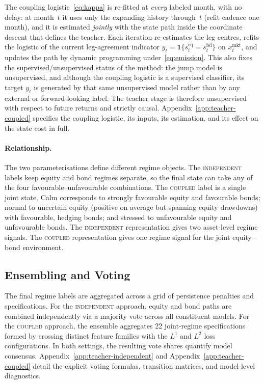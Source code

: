 \documentclass[10pt]{article}
\newcommand{\Acoup}{\textsc{coupled}}
\newcommand{\Bindep}{\textsc{independent}}
\begin{document}
The coupling logistic~\eqref{eq:kappa} is re-fitted at \emph{every} labeled month, with no
delay: at month~$t$ it uses only the expanding history through~$t$ (refit cadence one month),
and it is estimated \emph{jointly} with the state path inside the coordinate descent that
defines the teacher. Each iteration re-estimates the leg centres, refits the logistic of the
current leg-agreement indicator $y_t=\mathbf{1}\{s^{\mathrm{eq}}_t=s^{\mathrm{bd}}_t\}$ on
$x^{\mathrm{mkt}}_t$, and updates the path by dynamic programming under~\eqref{eq:emission}.
This also fixes the supervised/unsupervised status of the method: the jump model is
unsupervised, and although the coupling logistic is a supervised classifier, its target $y_t$
is generated by that same unsupervised model rather than by any external or forward-looking
label. The teacher stage is therefore unsupervised with respect to future returns and strictly
causal. Appendix~\ref{app:teacher-coupled} specifies the coupling logistic, its inputs, its
estimation, and its effect on the state cost in full.


\paragraph{Relationship.}
The two parameterisations define different regime objects. The \Bindep{} labels keep equity and bond regimes separate, so the final state can take any of the four favourable--unfavourable combinations. The \Acoup{} label is a single joint state. Calm corresponds to strongly favourable equity and favourable bonds; normal to uncertain equity (positive on average but spanning equity drawdowns) with favourable, hedging bonds; and stressed to unfavourable equity and unfavourable bonds. The \Bindep{} representation gives two asset-level regime signals. The \Acoup{} representation gives one regime signal for the joint equity--bond environment.
\subsection{Ensembling and Voting}
The final regime labels are aggregated across a grid of persistence penalties and specifications. For the \Bindep{} approach, equity and bond paths are combined independently via a majority vote across all constituent models. For the \Acoup{} approach, the ensemble aggregates 22 joint-regime specifications formed by crossing distinct feature families with the $L^1$ and $L^2$ loss configurations. In both settings, the resulting vote shares quantify model consensus. Appendix~\ref{app:teacher-independent} and Appendix~\ref{app:teacher-coupled} detail the explicit voting formulas, transition matrices, and model-level diagnostics.
\end{document}
